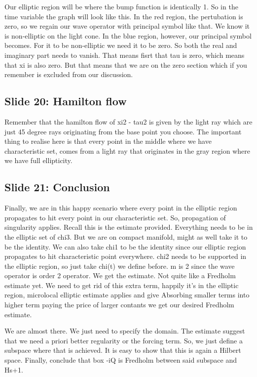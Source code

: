 \documentclass{article}
\begin{document}
Our elliptic region will be where the bump function is identically 1. So in the time variable the graph will look like this. In the red region, the pertubation is zero, so we regain our wave operator with principal symbol like that. We know it is non-elliptic on the light cone.  In the blue region, however,  our principal symbol becomes. For it to be non-elliptic we need it to be zero. So both the real and imaginary part needs to vanish. That means fisrt that tau is zero, which means that xi is also zero. But that means that we are on the zero section which if you remember is excluded from our discussion. 

\subsection{Slide 20: Hamilton flow}
Remember that the hamilton flow of xi2 - tau2 is given by the light ray which are just 45 degree rays originating from the base point you choose. The important thing to realise here is that every point in the middle where we have characteristic set, comes from a light ray that originates in the gray region where we have full ellipticity. 


\subsection{Slide 21: Conclusion}
Finally, we are in this happy scenario where every point in the elliptic region propagates to hit every point in our characteristic set. So, propagation of singularity applies. 
Recall this is the estimate provided. 
Everything needs to be in the elliptic set of chi3. But we are on compact manifold, might as well take it to be the identity. 
We can also take chi1 to be the identity since our elliptic region propagates to hit characteristic point everywhere. 
chi2 needs to be supported in the elliptic region, so just take chi(t) we define before. 
m is 2 since the wave operator is order 2 operator. We get the estimate. 
Not quite like a Fredholm estimate yet. We need to get rid of this extra term, happily it's in the elliptic region, microlocal elliptic estimate applies and give 
Absorbing smaller terms into higher term paying the price of larger contants we get our desired Fredholm estimate. 

We are almost there. We just need to specify the domain. The estimate suggest that we need a priori better regularity or the forcing term. So, we just define a subspace where that is achieved. It is easy to show that this is again a Hilbert space. Finally, conclude that box -iQ is Fredholm between said subspace and Hs+1. 
\end{document}
